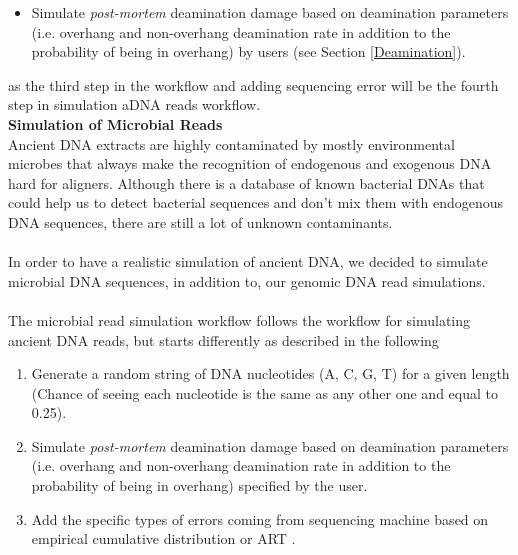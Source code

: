 \documentclass[11pt,a4paper]{report}
\begin{document}
\begin{itemize}
 
\item Simulate \emph{post-mortem} deamination damage based on 
deamination parameters (i.e. overhang and non-overhang deamination 
rate in addition to the probability of being in overhang) by users
(see Section \ref{Deamination}). 

\end{itemize}

as the third step in the workflow and adding sequencing error will be
the fourth step in simulation aDNA reads workflow.\\

\textbf{Simulation of Microbial Reads }\\

Ancient DNA extracts are highly contaminated by 
mostly environmental microbes that always make the 
recognition of endogenous and exogenous DNA hard for aligners.
Although there is a database of known bacterial DNAs that could help 
us to detect bacterial sequences and don't mix them with endogenous 
DNA sequences, there are still a lot of unknown contaminants.
\\\\
In order to have a realistic simulation of ancient DNA, we decided to
simulate microbial DNA sequences, in addition to, our genomic DNA 
read simulations.
\\\\
The microbial read simulation workflow follows the workflow for 
simulating ancient DNA reads, but starts differently as described 
in the following 

\begin{enumerate}

 \item Generate a random string of DNA nucleotides (A, C, G, T) 
 for a given length (Chance of seeing each nucleotide is the same as any
  other one and equal to 0.25).

\item Simulate \emph{post-mortem} deamination damage based on deamination
 parameters (i.e. overhang and non-overhang deamination rate in addition to 
 the probability of being in overhang) specified by the user. 

 \item Add the specific types of errors coming from sequencing machine 
 based on empirical cumulative distribution or ART\cite{art} .

\end{enumerate}
\end{document}
